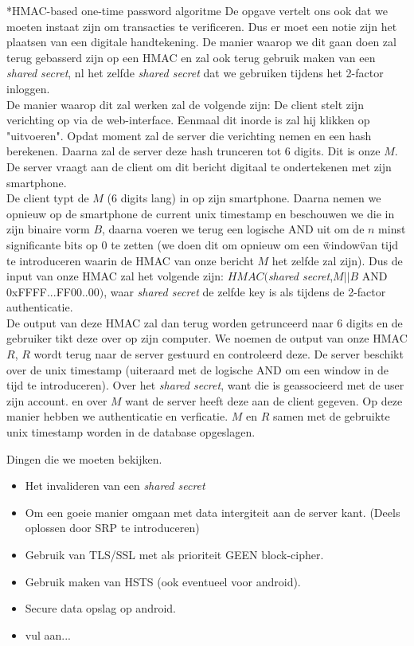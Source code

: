 \documentclass[10pt,a4paper]{report}
\begin{document}
\begin{section}*{HMAC-based one-time password algoritme}
De opgave vertelt ons ook dat we moeten instaat zijn om transacties te verificeren. Dus er moet een notie zijn het plaatsen van een digitale handtekening. De manier waarop we dit gaan doen zal terug gebasserd zijn op een HMAC en zal ook terug gebruik maken van een \emph{shared secret}, nl het zelfde \emph{shared secret} dat we gebruiken tijdens het 2-factor inloggen.\\

De manier waarop dit zal werken zal de volgende zijn:
De client stelt zijn verichting op via de web-interface. Eenmaal dit inorde is zal hij klikken op "uitvoeren". Opdat moment zal de server die verichting nemen en een hash berekenen. Daarna zal de server deze hash trunceren tot 6 digits. Dit is onze $M$. De server vraagt aan de client om dit bericht digitaal te ondertekenen met zijn smartphone. \\
De client typt de $M$ (6 digits lang) in op zijn smartphone. Daarna nemen we opnieuw op de smartphone de current unix timestamp en beschouwen we die in zijn binaire vorm $B$, daarna voeren we terug een logische AND uit om de $n$ minst significante bits op 0 te zetten (we doen dit om opnieuw om een \"window\" van tijd te introduceren waarin de HMAC van onze bericht $M$ het zelfde zal zijn). Dus de input van onze HMAC zal het volgende zijn: $HMAC($\emph{shared secret},$M||B$ AND 0xFFFF...FF00..00$)$, waar \emph{shared secret} de zelfde key is als tijdens de 2-factor authenticatie. \\
De output van deze HMAC zal dan terug worden getrunceerd naar 6 digits en de gebruiker tikt deze over op zijn computer. We noemen de output van onze HMAC $R$, $R$ wordt terug naar de server gestuurd en controleerd deze. De server beschikt over de unix timestamp (uiteraard met de logische AND om een window in de tijd te introduceren). Over het \emph{shared secret}, want die is geassocieerd met de user zijn account. en over $M$ want de server heeft deze aan de client gegeven. Op deze manier hebben we authenticatie en verficatie. $M$ en $R$ samen met de gebruikte unix timestamp worden in de database opgeslagen. 
\end{section} 
\begin{subsection}
Dingen die we moeten bekijken.
\begin{itemize}
\item Het invalideren van een \emph{shared secret}
\item Om een goeie manier omgaan met data intergiteit aan de server kant. (Deels oplossen door SRP te introduceren)
\item Gebruik van TLS/SSL met als prioriteit GEEN block-cipher.
\item Gebruik maken van HSTS (ook eventueel voor android).
\item Secure data opslag op android.
\item vul aan...
\end{itemize}
\end{subsection}
\end{document}

